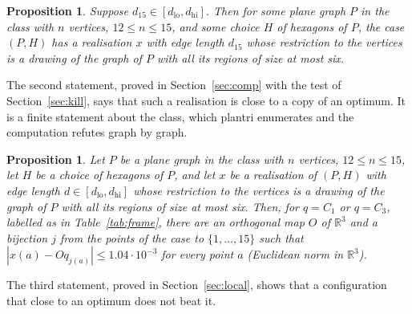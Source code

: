 \documentclass[12pt]{amsart}
\theoremstyle{definition}
\newcounter{mainthm}
\theoremstyle{plain}
\newtheorem{mainproposition}[mainthm]{Proposition}
\theoremstyle{definition}
\newcommand{\R}{\mathbb{R}}
\newcommand{\dlo}{d_{\mathrm{lo}}}
\newcommand{\dhi}{d_{\mathrm{hi}}}
\newcommand{\CI}{C_1}
\newcommand{\CIII}{C_3}
\newcommand{\leanmap}[1]{\ignorespaces}
\newcommand{\mapnote}[1]{\ignorespaces}
\begin{document}
\begin{mainproposition}\label{prop:A}\leanmap{Tammes15.structured_of_min, Tammes15.realisation_of_structured, Tammes15.D2Regions.planeClass_of_structured}\mapnote{the conclusions of Theorem \ref{thm:structure} in the form of \texttt{Tammes15.Structured} (first declaration), then the realisation (second) and the class of D2 on the drawing (third)}
Suppose $d_{15}\in[\dlo,\dhi]$. Then for some plane graph $P$ in the class with $n$ vertices, $12\le n\le15$, and some choice $H$ of hexagons of $P$, the case $(P,H)$ has a realisation $x$ with edge length $d_{15}$ whose restriction to the vertices is a drawing of the graph of $P$ with all its regions of size at most six.
\end{mainproposition}

The second statement, proved in Section~\ref{sec:comp} with the test of Section~\ref{sec:kill}, says that such a realisation is close to a copy of an optimum. It is a finite statement about the class, which plantri enumerates and the computation refutes graph by graph.

\begin{mainproposition}\label{prop:B}\mapnote{not formalized as one statement; it is the step of the proof of \texttt{Tammes15.reduction} from D2 and D3 to the closeness to a frame configuration}
Let $P$ be a plane graph in the class with $n$ vertices, $12\le n\le15$, let $H$ be a choice of hexagons of $P$, and let $x$ be a realisation of $(P,H)$ with edge length $d\in[\dlo,\dhi]$ whose restriction to the vertices is a drawing of the graph of $P$ with all its regions of size at most six. Then, for $q=\CI$ or $q=\CIII$, labelled as in Table~\ref{tab:frame}, there are an orthogonal map $O$ of $\R^3$ and a bijection $j$ from the points of the case to $\{1,\dots,15\}$ such that $|x(a)-Oq_{j(a)}|\le1.04\cdot10^{-3}$ for every point $a$ (Euclidean norm in $\R^3$).
\end{mainproposition}

The third statement, proved in Section~\ref{sec:local}, shows that a configuration that close to an optimum does not beat it.
\end{document}
